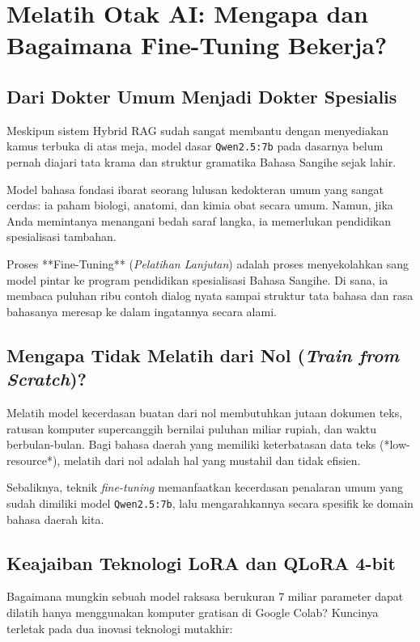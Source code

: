 \chapter{Melatih Otak AI: Mengapa dan Bagaimana Fine-Tuning Bekerja?}

\section{Dari Dokter Umum Menjadi Dokter Spesialis}
Meskipun sistem Hybrid RAG sudah sangat membantu dengan menyediakan kamus terbuka di atas meja, model dasar \texttt{Qwen2.5:7b} pada dasarnya belum pernah diajari tata krama dan struktur gramatika Bahasa Sangihe sejak lahir. 

\begin{infobox}
Model bahasa fondasi ibarat seorang lulusan kedokteran umum yang sangat cerdas: ia paham biologi, anatomi, dan kimia obat secara umum. Namun, jika Anda memintanya menangani bedah saraf langka, ia memerlukan pendidikan spesialisasi tambahan. 

Proses **Fine-Tuning** (\textit{Pelatihan Lanjutan}) adalah proses menyekolahkan sang model pintar ke program pendidikan spesialisasi Bahasa Sangihe. Di sana, ia membaca puluhan ribu contoh dialog nyata sampai struktur tata bahasa dan rasa bahasanya meresap ke dalam ingatannya secara alami.
\end{infobox}

\section{Mengapa Tidak Melatih dari Nol (\textit{Train from Scratch})?}
Melatih model kecerdasan buatan dari nol membutuhkan jutaan dokumen teks, ratusan komputer supercanggih bernilai puluhan miliar rupiah, dan waktu berbulan-bulan. Bagi bahasa daerah yang memiliki keterbatasan data teks (*low-resource*), melatih dari nol adalah hal yang mustahil dan tidak efisien.

Sebaliknya, teknik \textit{fine-tuning} memanfaatkan kecerdasan penalaran umum yang sudah dimiliki model \texttt{Qwen2.5:7b}, lalu mengarahkannya secara spesifik ke domain bahasa daerah kita.

\section{Keajaiban Teknologi LoRA dan QLoRA 4-bit}
Bagaimana mungkin sebuah model raksasa berukuran 7 miliar parameter dapat dilatih hanya menggunakan komputer gratisan di Google Colab? Kuncinya terletak pada dua inovasi teknologi mutakhir:

